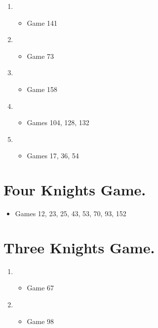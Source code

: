 \begin{multicols}{2}
\begin{enumerate}
\begin{enumerate}
\item {}
\begin{itemize}
\item Game 141
\end{itemize}

\item {}
\begin{itemize}
\item Game 73
\end{itemize}

\item {}
\begin{itemize}
\item Game 158
\end{itemize}

\item {}
\begin{itemize}
\item Games 104, 128, 132
\end{itemize}

\item {}
\begin{itemize}
\item Games 17, 36, 54
\end{itemize}

\end{enumerate}
\end{enumerate}

\section{Four Knights Game.}  
\newgame{}
\begin{itemize}
\item Games 12, 23, 25, 43, 53, 70, 93, 152
\end{itemize}

\section{Three Knights Game.} 
\newgame{}
\begin{enumerate}
\item {}
\begin{itemize}
\item Game 67
\end{itemize}
\item {}
\begin{itemize}
\item Game 98
\end{itemize}
\end{enumerate}


\end{multicols}
